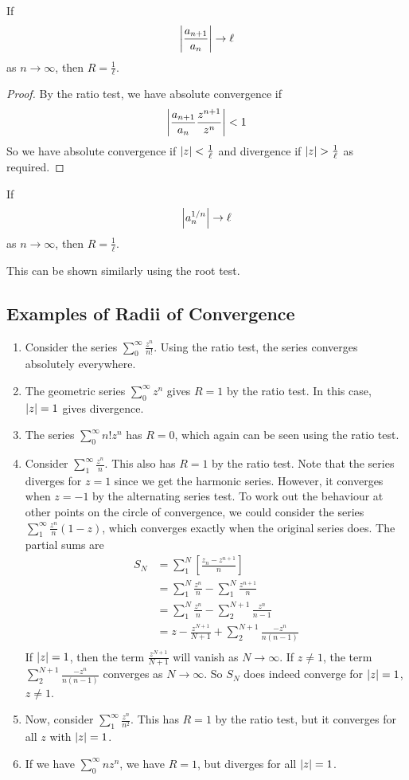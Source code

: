 \documentclass{article}
\begin{document}
\begin{lemma}
	If
	\[ \abs{\frac{a_{n+1}}{a_n}} \to \ell \]
	as $n \to \infty$, then $R = \frac{1}{\ell}$.
\end{lemma}
\begin{proof}
	By the ratio test, we have absolute convergence if
	\[ \abs{\frac{a_{n+1}}{a_n} \frac{z^{n+1}}{z^n}} < 1 \]
	So we have absolute convergence if $\abs{z} < \frac{1}{\ell}$ and divergence if $\abs{z} > \frac{1}{\ell}$ as required.
\end{proof}
\begin{lemma}
	If
	\[ \abs{a_n^{1/n}} \to \ell \]
	as $n \to \infty$, then $R = \frac{1}{\ell}$.
\end{lemma}
\noindent This can be shown similarly using the root test.

\subsection{Examples of Radii of Convergence}
\begin{enumerate}
	\item Consider the series $\sum_0^\infty \frac{z^n}{n!}$. Using the ratio test, the series converges absolutely everywhere.
	\item The geometric series $\sum_0^\infty z^n$ gives $R=1$ by the ratio test. In this case, $\abs{z} = 1$ gives divergence.
	\item The series $\sum_0^\infty n!z^n$ has $R=0$, which again can be seen using the ratio test.
	\item Consider $\sum_1^\infty \frac{z^n}{n}$. This also has $R = 1$ by the ratio test. Note that the series diverges for $z=1$ since we get the harmonic series. However, it converges when $z = -1$ by the alternating series test. To work out the behaviour at other points on the circle of convergence, we could consider the series $\sum_1^\infty \frac{z^n}{n}(1-z)$, which converges exactly when the original series does. The partial sums are
	      \begin{align*}
		      S_N & = \sum_1^N \left[ \frac{z_n - z^{n+1}}{n} \right]            \\
		          & = \sum_1^N \frac{z^n}{n} - \sum_1^N \frac{z^{n+1}}{n}        \\
		          & = \sum_1^N \frac{z^n}{n} - \sum_2^{N+1} \frac{z^n}{n-1}      \\
		          & = z - \frac{z^{N+1}}{N+1} + \sum_2^{N+1} \frac{-z^n}{n(n-1)} \\
	      \end{align*}
	      If $\abs{z} = 1$, then the term $\frac{z^{N+1}}{N+1}$ will vanish as $N \to \infty$. If $z \neq 1$, the term $\sum_2^{N+1} \frac{-z^n}{n(n-1)}$ converges as $N \to \infty$. So $S_N$ does indeed converge for $\abs{z} = 1$, $z \neq 1$.
	\item Now, consider $\sum_1^\infty \frac{z^n}{n^2}$. This has $R=1$ by the ratio test, but it converges for all $z$ with $\abs{z} = 1$.
	\item If we have $\sum_0^\infty nz^n$, we have $R=1$, but diverges for all $\abs{z} = 1$.
\end{enumerate}
\end{document}
